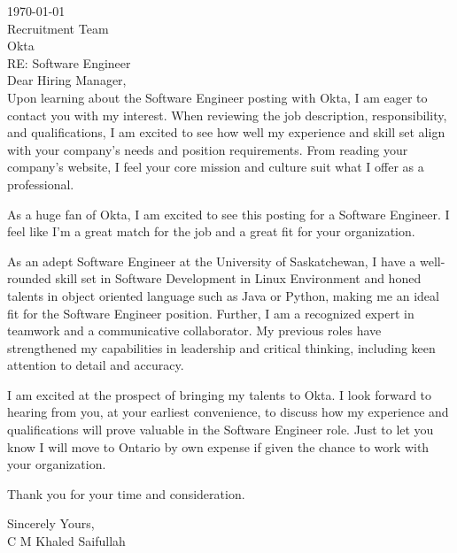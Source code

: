 \documentclass[10pt,a4paper,ragged2e,withhyper]{altacv}
\begin{document}

\makecvheader

\hfill \break
\hfill \break

\today\\
\hfill \break
Recruitment Team\\
Okta\\
\hfil \break
RE: Software Engineer\\
\hfil \break
Dear Hiring Manager,\\
\hfill\break
Upon learning about the Software Engineer posting with Okta, I am eager to contact you with my interest. When reviewing the job description, responsibility, and qualifications, I am excited to see how well my experience and skill set align with your company's needs and position requirements. From reading your company's website, I feel your core mission and culture suit what I offer as a professional.\\
\hfill \break

As a huge fan of Okta, I am excited to see this posting for a Software Engineer. I feel like I'm a great match for the job and a great fit for your organization.\\
\hfill \break

As an adept Software Engineer at the University of Saskatchewan, I have a well-rounded skill set in Software Development in Linux Environment and honed talents in object oriented language such as Java or Python, making me an ideal fit for the Software Engineer position. Further, I am a recognized expert in teamwork and a communicative collaborator. My previous roles have strengthened my capabilities in leadership and critical thinking, including keen attention to detail and accuracy.\\
\hfill \break

I am excited at the prospect of bringing my talents to Okta. I look forward to hearing from you, at your earliest convenience, to discuss how my experience and qualifications will prove valuable in the Software Engineer role. Just to let you know I will move to Ontario by own expense if given the chance to work with your organization.\\
\hfill \break

Thank you for your time and consideration.\\
\hfill \break

\hfill \break
\hfill \break
Sincerely Yours,\\
C M Khaled Saifullah
\end{document}
